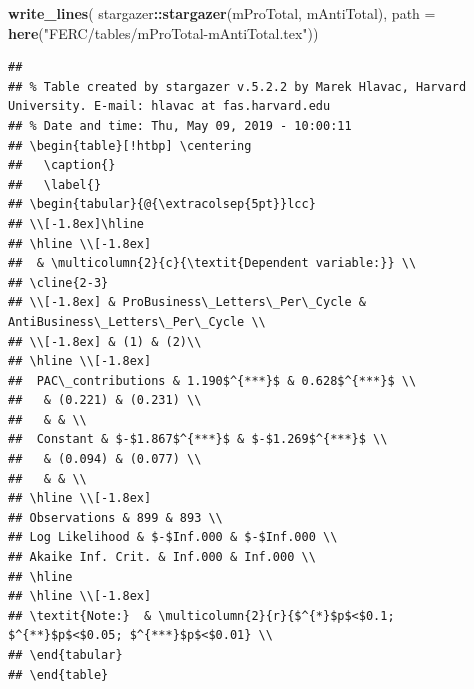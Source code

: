 \documentclass[]{article}
\newenvironment{Shaded}{\begin{snugshade}}{\end{snugshade}}
\newcommand{\KeywordTok}[1]{\textcolor[rgb]{0.13,0.29,0.53}{\textbf{#1}}}
\newcommand{\DataTypeTok}[1]{\textcolor[rgb]{0.13,0.29,0.53}{#1}}
\newcommand{\StringTok}[1]{\textcolor[rgb]{0.31,0.60,0.02}{#1}}
\newcommand{\OperatorTok}[1]{\textcolor[rgb]{0.81,0.36,0.00}{\textbf{#1}}}
\newcommand{\NormalTok}[1]{#1}
\begin{document}
\begin{Shaded}
\begin{Highlighting}[]
\KeywordTok{write_lines}\NormalTok{(}
\NormalTok{  stargazer}\OperatorTok{::}\KeywordTok{stargazer}\NormalTok{(mProTotal, mAntiTotal),}
  \DataTypeTok{path =} \KeywordTok{here}\NormalTok{(}\StringTok{"FERC/tables/mProTotal-mAntiTotal.tex"}\NormalTok{))}
\end{Highlighting}
\end{Shaded}

\begin{verbatim}
## 
## % Table created by stargazer v.5.2.2 by Marek Hlavac, Harvard University. E-mail: hlavac at fas.harvard.edu
## % Date and time: Thu, May 09, 2019 - 10:00:11
## \begin{table}[!htbp] \centering 
##   \caption{} 
##   \label{} 
## \begin{tabular}{@{\extracolsep{5pt}}lcc} 
## \\[-1.8ex]\hline 
## \hline \\[-1.8ex] 
##  & \multicolumn{2}{c}{\textit{Dependent variable:}} \\ 
## \cline{2-3} 
## \\[-1.8ex] & ProBusiness\_Letters\_Per\_Cycle & AntiBusiness\_Letters\_Per\_Cycle \\ 
## \\[-1.8ex] & (1) & (2)\\ 
## \hline \\[-1.8ex] 
##  PAC\_contributions & 1.190$^{***}$ & 0.628$^{***}$ \\ 
##   & (0.221) & (0.231) \\ 
##   & & \\ 
##  Constant & $-$1.867$^{***}$ & $-$1.269$^{***}$ \\ 
##   & (0.094) & (0.077) \\ 
##   & & \\ 
## \hline \\[-1.8ex] 
## Observations & 899 & 893 \\ 
## Log Likelihood & $-$Inf.000 & $-$Inf.000 \\ 
## Akaike Inf. Crit. & Inf.000 & Inf.000 \\ 
## \hline 
## \hline \\[-1.8ex] 
## \textit{Note:}  & \multicolumn{2}{r}{$^{*}$p$<$0.1; $^{**}$p$<$0.05; $^{***}$p$<$0.01} \\ 
## \end{tabular} 
## \end{table}
\end{verbatim}
\end{document}
